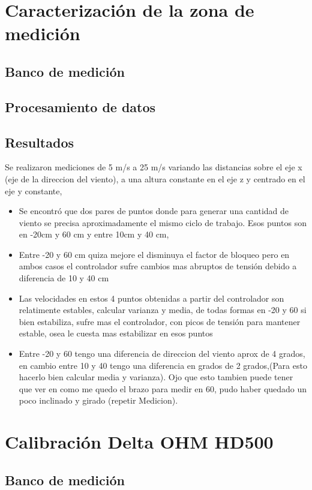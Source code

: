 \section{Caracterización de la zona de medición}
\subsection{Banco de medición}
\subsection{Procesamiento de datos}
\subsection{Resultados}


Se realizaron mediciones de 5 m/s a 25 m/s variando las distancias sobre el eje x (eje de la direccion del viento), a una altura constante en el eje z y centrado en el eje y constante, 

\begin{itemize}
    \item Se encontró que dos pares de puntos donde para generar una cantidad de viento se precisa aproximadamente el mismo ciclo de trabajo. Esos puntos son en -20cm y 60 cm y entre 10cm y 40 cm, 
    \item Entre -20 y 60 cm quiza mejore el disminuya el factor de bloqueo pero en ambos casos el controlador sufre cambios mas abruptos de tensión debido a diferencia de 10 y 40 cm
    \item Las velocidades en estos 4 puntos obtenidas a partir del controlador son relatimente estables, calcular varianza y media, de todas formas en -20 y 60 si bien estabiliza, sufre mas el controlador, con picos de tensión para mantener estable, osea le cuesta mas estabilizar en esos puntos
    \item Entre -20 y 60 tengo una diferencia de direccion del  viento aprox de  4 grados, en cambio entre 10 y 40 tengo una diferencia en grados de 2 grados,(Para esto hacerlo bien calcular media y varianza). Ojo que esto tambien puede tener que ver en como me quedo el brazo para medir en 60, pudo haber quedado un poco inclinado y girado (repetir Medicion).
\end{itemize}

\section{Calibración Delta OHM HD500}
\subsection{Banco de medición}
